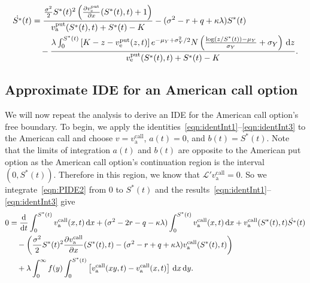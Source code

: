 	\begin{equation}
		\label{eqn:SApproxPutLN}
		\begin{split}
		\dot{S^*}(t) &= \frac{\frac{\sigma^2}{2}S^*(t)^2\left( \frac{\partial  v_{\text{e}}^{\text{put}} }{\partial x}(S^*(t),t) + 1\right)}{v_{\text{a}}^{\text{put}}(S^*(t),t) + S^*(t) - K} - (\sigma^2 - r + q +\kappa\lambda)S^*(t)  \\
				&\quad{} - \frac{\lambda\int_0^{S^*(t)} \left[K - z -  v_{\text{e}}^{\text{put}}(z,t)\right]  e^{-\mu_Y + \sigma_Y^2/2}N\left( \frac{\log(z/S^*(t)) - \mu_Y}{\sigma_Y} + \sigma_Y \right) \, \mathrm d z}{ v_{\text{e}}^{\text{put}}(S^*(t),t) + S^*(t) - K} .
		\end{split}
	\end{equation}

\subsection{Approximate IDE for an American call option}
We will now repeat the analysis to derive an IDE for the American call option's free boundary. To begin, we apply the identities~\eqref{eqn:identInt1}--\eqref{eqn:identInt3} to the American call and choose $v = v_{\text{a}}^{\text{call}}$, $a(t) = 0$, and $b(t) = S^*(t)$. Note that the limits of integration $a(t)$ and $b(t)$ are opposite to the American put option as the American call option's continuation region is the interval $(0,S^*(t))$. Therefore in this region, we know that $\mathscr{L}' v_{\text{a}}^{\text{call}} = 0$. So we integrate~\eqref{eqn:PIDE2} from $0$ to $S^*(t)$ and the results~\eqref{eqn:identInt1}--\eqref{eqn:identInt3} give
	\begin{equation}
        		\label{eqn:longeqn1b}
        		\begin{split}
        		0 &= \frac{\mathrm d}{\mathrm d t}\int_{0}^{S^*(t)} v_{\text{a}}^{\text{call}}(x,t) \, \mathrm d x + (\sigma^2 - 2r - q -\kappa\lambda)\int_{0}^{S^*(t)} v_{\text{a}}^{\text{call}}(x,t) \, \mathrm d x + v_{\text{a}}^{\text{call}}(S^*(t),t)\dot{S^*}(t) \\
        		&\quad{} -\left( \frac{\sigma^2}{2}S^*(t)^2\frac{\partial v_{\text{a}}^{\text{call}}}{\partial x}(S^*(t),t) - (\sigma^2 - r + q + \kappa\lambda)v_{\text{a}}^{\text{call}}(S^*(t),t) \right) \\
        		&\quad{} +\lambda\int_0^\infty f(y) \int_{0}^{S^*(t)} \left[v_{\text{a}}^{\text{call}}(xy,t) - v_{\text{a}}^{\text{call}}(x,t)\right] \, \mathrm d x \, \mathrm d y.
        		\end{split}
        	\end{equation}
